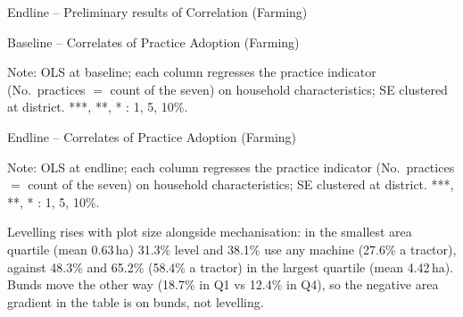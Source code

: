 \documentclass[aspectratio=169]{beamer}
\newcommand{\notefont}{\fontsize{5pt}{6pt}\selectfont}
\begin{document}
\begin{frame}{Endline -- Preliminary results of Correlation (Farming)}
	\centering
	
\end{frame}

\begin{frame}{Baseline -- Correlates of Practice Adoption (Farming)}
	\centering
	\begin{minipage}{0.94\textwidth}
		\notefont
		Note: OLS at baseline; each column regresses the practice indicator (No.\ practices
		$=$ count of the seven) on household characteristics; SE clustered at district.
		***, **, * : 1, 5, 10\%.
	\end{minipage}
\end{frame}

\begin{frame}{Endline -- Correlates of Practice Adoption (Farming)}
	\centering
	\begin{minipage}{0.94\textwidth}
		\notefont
		Note: OLS at endline; each column regresses the practice indicator (No.\ practices
		$=$ count of the seven) on household characteristics; SE clustered at district.
		***, **, * : 1, 5, 10\%.
		\par Levelling rises with plot size alongside mechanisation: in the smallest area quartile
		(mean 0.63\,ha) 31.3\% level and 38.1\% use any machine (27.6\% a tractor), against 48.3\%
		and 65.2\% (58.4\% a tractor) in the largest quartile (mean 4.42\,ha). Bunds move the other
		way (18.7\% in Q1 vs 12.4\% in Q4), so the negative area gradient in the table is on bunds,
		not levelling.
	\end{minipage}
\end{frame}
\end{document}
